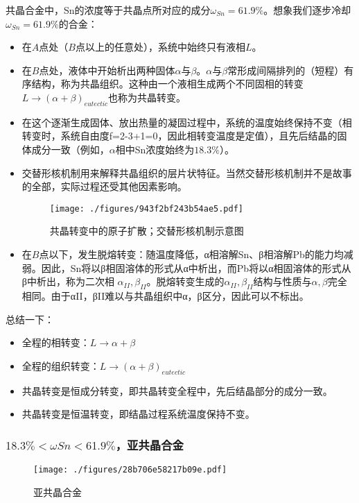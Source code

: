 共晶合金中，Sn的浓度等于共晶点所对应的成分$\omega_{Sn}=61.9\%$。想象我们逐步冷却$\omega_{Sn}=61.9\%$的合金：
\begin{itemize}
\item 在$A$点处（$B$点以上的任意处），系统中始终只有液相$L$。
\item 在$B$点处，液体中开始析出两种固体$\alpha$与$\beta$。$\alpha$与$\beta$常形成间隔排列的（短程）有序结构，称为共晶组织。这种由一个液相生成两个不同固相的转变$L\to(\alpha+\beta)_{eutectic}$也称为共晶转变。
\item 在这个逐渐生成固体、放出热量的凝固过程中，系统的温度始终保持不变（相转变时，系统自由度f=2-3+1=0，因此相转变温度是定值），且先后结晶的固体成分一致（例如，$\alpha$相中Sn浓度始终为$18.3\%$）。
\item 交替形核机制用来解释共晶组织的层片状特征。当然交替形核机制并不是故事的全部，实际过程还受其他因素影响。
\begin{figure}[ht]
\centering
\texttt{[image: ./figures/943f2bf243b54ae5.pdf]}
\caption{共晶转变中的原子扩散；交替形核机制示意图} \label{fig_EUTECT_6}
\end{figure}
\item 在$B$点以下，发生脱熔转变：随温度降低，α相溶解Sn、β相溶解Pb的能力均减弱。因此，Sn将以β相固溶体的形式从α中析出，而Pb将以α相固溶体的形式从β中析出，称为二次相 $\alpha_{II},\beta_{II} $。脱熔转变生成的$\alpha_{II},\beta_{II} $结构与性质与$\alpha, \beta$完全相同。由于αII，βII难以与共晶组织中α，β区分，因此可以不标出。
\end{itemize}

总结一下：
\begin{itemize}
\item 全程的相转变：$L \rightarrow \alpha+\beta$
\item 全程的组织转变：$L \rightarrow (\alpha+\beta)_{eutectic}$
\item 共晶转变是恒成分转变，即共晶转变全程中，先后结晶部分的成分一致。
\item 共晶转变是恒温转变，即结晶过程系统温度保持不变。
\end{itemize}

\subsubsection{$18.3\%<\omega Sn<61.9\%$，亚共晶合金}
\begin{figure}[ht]
\centering
\texttt{[image: ./figures/28b706e58217b09e.pdf]}
\caption{亚共晶合金} \label{fig_EUTECT_3}
\end{figure}

